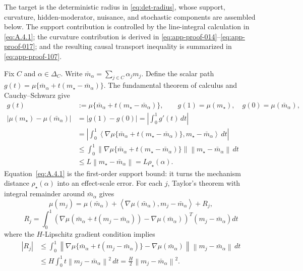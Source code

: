 \documentclass[11pt]{article}
\numberwithin{equation}{section}
\newcommand{\1}{\mathbf 1}
\newcommand{\norm}[1]{\left\lVert #1\right\rVert}
\newcommand{\abs}[1]{\left\lvert #1\right\rvert}
\newcommand{\ip}[2]{\left\langle #1,#2\right\rangle}
\begin{document}
The target is the deterministic radius in \eqref{eq:det-radius}, whose
support, curvature, hidden-moderator, nuisance, and stochastic components are
assembled below.  The support contribution is controlled by the line-integral
calculation in \eqref{eq:A.4.1}; the curvature contribution is derived in
\eqref{eq:app-proof-014}--\eqref{eq:app-proof-017}; and the resulting causal
transport inequality is summarized in \eqref{eq:app-proof-107}.

Fix \(C\) and \(\alpha\in\Delta_C\).  Write \(\bar m_\alpha=\sum_{j\in C}\alpha_jm_j\).  Define the scalar path \(g(t)=\mu\{\bar m_\alpha+t(m_\star-\bar m_\alpha)\}\).  The fundamental theorem of calculus and Cauchy--Schwarz give
\begin{equation}
\label{eq:A.4.1}
\begin{aligned}
g(t)&:=\mu\{\bar m_\alpha+t(m_\star-\bar m_\alpha)\},
\qquad g(1)=\mu(m_\star),\quad g(0)=\mu(\bar m_\alpha),\\
\abs{\mu(m_\star)-\mu(\bar m_\alpha)}
&=\abs{g(1)-g(0)}
=\abs{\int_0^1 g'(t)\,dt}\\
&=\abs{\int_0^1
\ip{\nabla\mu\{\bar m_\alpha+t(m_\star-\bar m_\alpha)\}}
{m_\star-\bar m_\alpha}\,dt}\\
&\le\int_0^1
\norm{\nabla\mu\{\bar m_\alpha+t(m_\star-\bar m_\alpha)\}}
\norm{m_\star-\bar m_\alpha}\,dt\\
&\le L\norm{m_\star-\bar m_\alpha}
=L\rho_\star(\alpha).
\end{aligned}
\end{equation}
Equation~\eqref{eq:A.4.1} is the first-order support bound: it turns the
mechanism distance \(\rho_\star(\alpha)\) into an effect-scale error.
For each \(j\), Taylor's theorem with integral remainder around \(\bar m_\alpha\) gives
\begin{equation}
\label{eq:app-proof-014}
\mu(m_j)
  =\mu(\bar m_\alpha)+\ip{\nabla\mu(\bar m_\alpha)}{m_j-\bar m_\alpha}+R_j,
\end{equation}
\begin{equation}
\label{eq:app-proof-015}
R_j=\int_0^1(\nabla\mu(\bar m_\alpha+t(m_j-\bar m_\alpha))-\nabla\mu(\bar m_\alpha))^T(m_j-\bar m_\alpha)dt
\end{equation}
where the \(H\)-Lipschitz gradient condition implies
\begin{equation}
\label{eq:app-proof-016}
\begin{aligned}
\abs{R_j}
&\le\int_0^1
\norm{\nabla\mu\{\bar m_\alpha+t(m_j-\bar m_\alpha)\}
-\nabla\mu(\bar m_\alpha)}
\norm{m_j-\bar m_\alpha}\,dt\\
&\le H\int_0^1 t\norm{m_j-\bar m_\alpha}^2\,dt
=\frac{H}{2}\norm{m_j-\bar m_\alpha}^2.
\end{aligned}
\end{equation}
\end{document}
